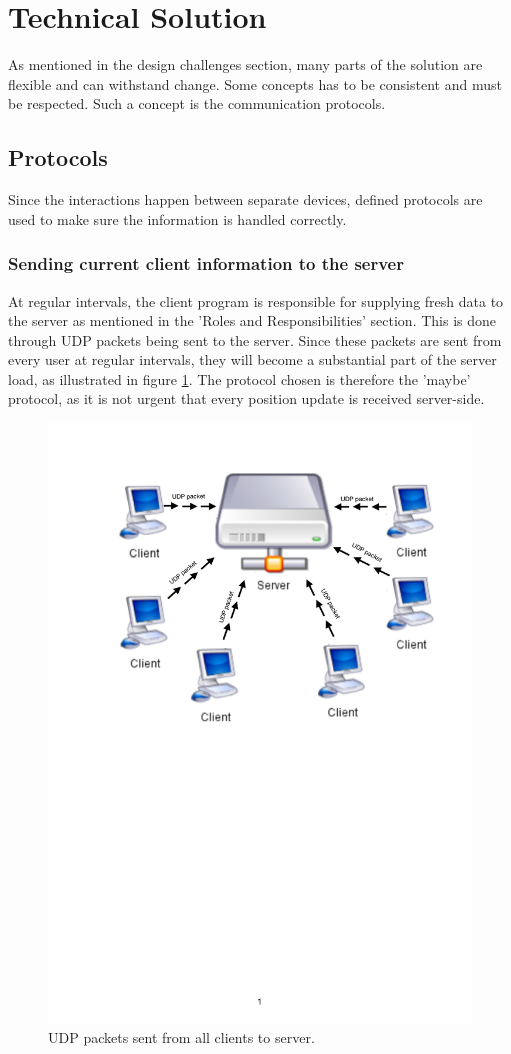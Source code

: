 \section{Technical Solution}

As mentioned in the design challenges section, many parts of the solution are flexible and can withstand change. Some concepts has to be consistent and must be respected. Such a concept is the communication protocols. 

\subsection{Protocols}

Since the interactions happen between separate devices, defined protocols are used to make sure the information is handled correctly. 

\subsubsection{Sending current client information to the server}
At regular intervals, the client program is responsible for supplying fresh data to the server as mentioned in the 'Roles and Responsibilities' section. This is done through UDP packets being sent to the server. Since these packets are sent from every user at regular intervals, they will become a substantial part of the server load, as illustrated in figure \ref{fig:udp_packets}. The protocol chosen is therefore the 'maybe' protocol, as it is not urgent that every position update is received server-side. 

\begin{figure}[H]
    \centering
    \includegraphics[width=0.6\linewidth]{images/UDPPackets.pdf}
    \caption{UDP packets sent from all clients to server.}
    \label{fig:udp_packets}
\end{figure}

